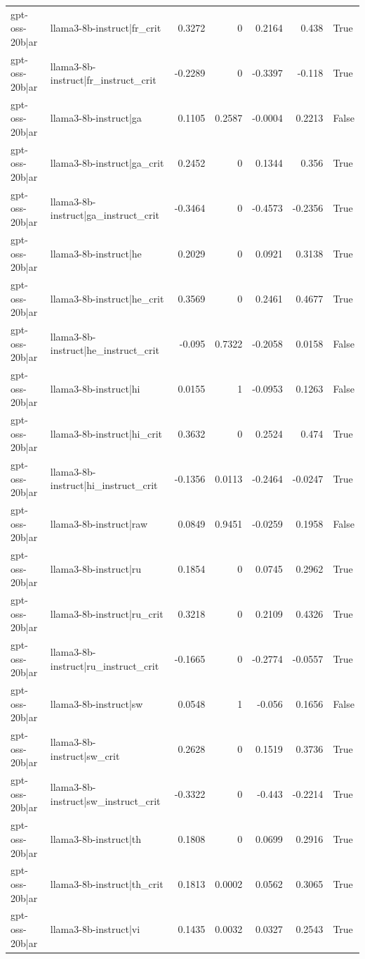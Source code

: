 \begin{table}
\begin{tabular}{l l r r r r l}
gpt-oss-20b|ar & llama3-8b-instruct|fr_crit & 0.3272 & 0 & 0.2164 & 0.438 & True \\
gpt-oss-20b|ar & llama3-8b-instruct|fr_instruct_crit & -0.2289 & 0 & -0.3397 & -0.118 & True \\
gpt-oss-20b|ar & llama3-8b-instruct|ga & 0.1105 & 0.2587 & -0.0004 & 0.2213 & False \\
gpt-oss-20b|ar & llama3-8b-instruct|ga_crit & 0.2452 & 0 & 0.1344 & 0.356 & True \\
gpt-oss-20b|ar & llama3-8b-instruct|ga_instruct_crit & -0.3464 & 0 & -0.4573 & -0.2356 & True \\
gpt-oss-20b|ar & llama3-8b-instruct|he & 0.2029 & 0 & 0.0921 & 0.3138 & True \\
gpt-oss-20b|ar & llama3-8b-instruct|he_crit & 0.3569 & 0 & 0.2461 & 0.4677 & True \\
gpt-oss-20b|ar & llama3-8b-instruct|he_instruct_crit & -0.095 & 0.7322 & -0.2058 & 0.0158 & False \\
gpt-oss-20b|ar & llama3-8b-instruct|hi & 0.0155 & 1 & -0.0953 & 0.1263 & False \\
gpt-oss-20b|ar & llama3-8b-instruct|hi_crit & 0.3632 & 0 & 0.2524 & 0.474 & True \\
gpt-oss-20b|ar & llama3-8b-instruct|hi_instruct_crit & -0.1356 & 0.0113 & -0.2464 & -0.0247 & True \\
gpt-oss-20b|ar & llama3-8b-instruct|raw & 0.0849 & 0.9451 & -0.0259 & 0.1958 & False \\
gpt-oss-20b|ar & llama3-8b-instruct|ru & 0.1854 & 0 & 0.0745 & 0.2962 & True \\
gpt-oss-20b|ar & llama3-8b-instruct|ru_crit & 0.3218 & 0 & 0.2109 & 0.4326 & True \\
gpt-oss-20b|ar & llama3-8b-instruct|ru_instruct_crit & -0.1665 & 0 & -0.2774 & -0.0557 & True \\
gpt-oss-20b|ar & llama3-8b-instruct|sw & 0.0548 & 1 & -0.056 & 0.1656 & False \\
gpt-oss-20b|ar & llama3-8b-instruct|sw_crit & 0.2628 & 0 & 0.1519 & 0.3736 & True \\
gpt-oss-20b|ar & llama3-8b-instruct|sw_instruct_crit & -0.3322 & 0 & -0.443 & -0.2214 & True \\
gpt-oss-20b|ar & llama3-8b-instruct|th & 0.1808 & 0 & 0.0699 & 0.2916 & True \\
gpt-oss-20b|ar & llama3-8b-instruct|th_crit & 0.1813 & 0.0002 & 0.0562 & 0.3065 & True \\
gpt-oss-20b|ar & llama3-8b-instruct|vi & 0.1435 & 0.0032 & 0.0327 & 0.2543 & True \\

\end{tabular}
\end{table}
